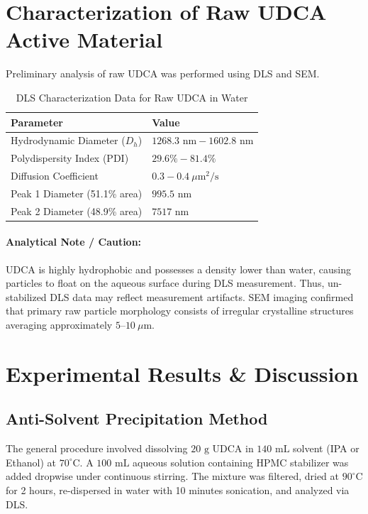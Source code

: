 \documentclass[11pt,a4paper]{article}
\begin{document}
\section{Characterization of Raw UDCA Active Material}
Preliminary analysis of raw UDCA was performed using DLS and SEM. 

\begin{table}[H]
\centering
\caption{DLS Characterization Data for Raw UDCA in Water}
\begin{tabular}{ll}
\toprule
\textbf{Parameter} & \textbf{Value} \\
\midrule
Hydrodynamic Diameter ($D_h$) & $1268.3\text{ nm} - 1602.8\text{ nm}$ \\
Polydispersity Index (PDI) & $29.6\% - 81.4\%$ \\
Diffusion Coefficient & $0.3 - 0.4\ \mu\text{m}^2/\text{s}$ \\
Peak 1 Diameter (51.1\% area) & $995.5\text{ nm}$ \\
Peak 2 Diameter (48.9\% area) & $7517\text{ nm}$ \\
\bottomrule
\end{tabular}
\end{table}

\paragraph{Analytical Note / Caution:} UDCA is highly hydrophobic and possesses a density lower than water, causing particles to float on the aqueous surface during DLS measurement. Thus, un-stabilized DLS data may reflect measurement artifacts. SEM imaging confirmed that primary raw particle morphology consists of irregular crystalline structures averaging approximately $5$--$10\ \mu\text{m}$.

\section{Experimental Results \& Discussion}

\subsection{Anti-Solvent Precipitation Method}
The general procedure involved dissolving $20\text{ g}$ UDCA in $140\text{ mL}$ solvent (IPA or Ethanol) at $70^\circ\text{C}$. A $100\text{ mL}$ aqueous solution containing HPMC stabilizer was added dropwise under continuous stirring. The mixture was filtered, dried at $90^\circ\text{C}$ for 2 hours, re-dispersed in water with 10 minutes sonication, and analyzed via DLS.
\end{document}
